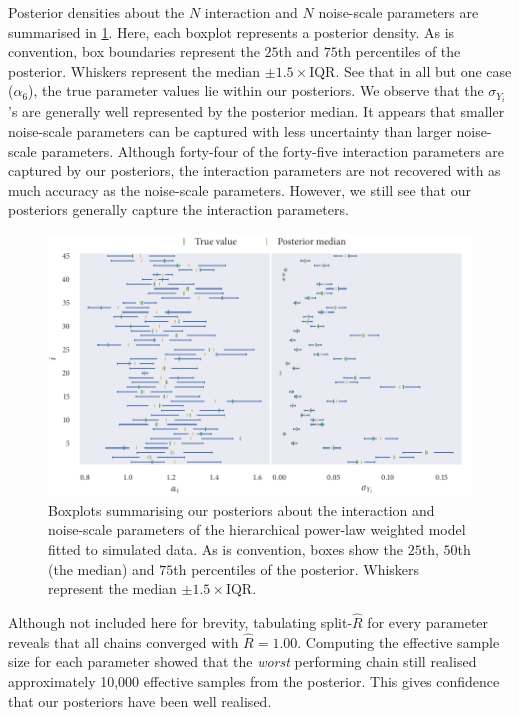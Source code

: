 Posterior densities about the $N$ interaction and $N$ noise-scale parameters are
summarised in \cref{fig:power_hier_summary}. Here, each boxplot represents a
posterior density. As is convention, box boundaries represent the $25$th and
$75$th percentiles of the posterior. Whiskers represent the median
$\pm1.5\times\text{IQR}$. See that in all but one case ($\alpha_6$), the true
parameter values lie within our posteriors. We observe that the
$\sigma_{Y_i}$'s are generally well represented by the posterior median. It
appears that smaller noise-scale parameters can be captured with less
uncertainty than larger noise-scale parameters. Although forty-four of the
forty-five interaction parameters are captured by our posteriors, the
interaction parameters are not recovered with as much accuracy as the
noise-scale parameters. However, we still see that our posteriors generally
capture the interaction parameters. 

\begin{figure}[tbp]
  \includegraphics{power/power_hier_summary.pdf}
  \caption{Boxplots summarising our posteriors about the interaction and
    noise-scale parameters of the hierarchical power-law weighted model
    fitted to simulated data. As is convention, boxes show the $25$th, $50$th
    (the median) and $75$th percentiles of the posterior. Whiskers represent
    the median $\pm 1.5\times\text{IQR}$.}
  \label{fig:power_hier_summary}
\end{figure}

Although not included here for brevity, tabulating split-$\widehat{R}$ for
every parameter reveals that all chains converged with
$\widehat{R}=1.00$. Computing the effective sample size for each
parameter showed that the \emph{worst} performing chain still realised
approximately 10,000 effective samples from the posterior. This gives
confidence that our posteriors have been well realised.

